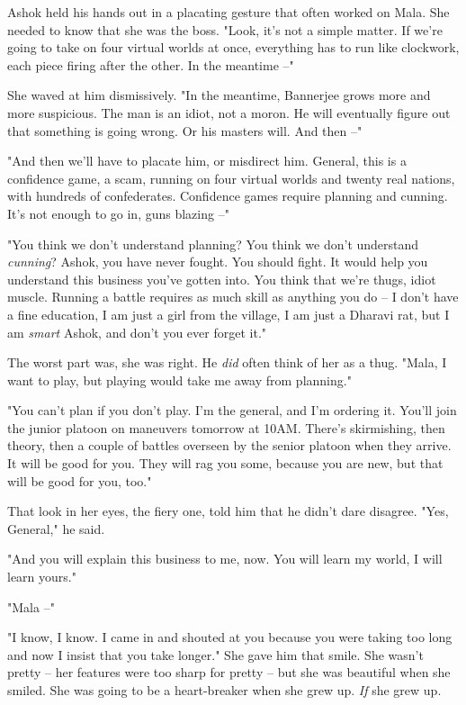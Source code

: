 Ashok held his hands out in a placating gesture that often worked
on Mala. She needed to know that she was the boss. "Look, it's not
a simple matter. If we're going to take on four virtual worlds at
once, everything has to run like clockwork, each piece firing after
the other. In the meantime --"

She waved at him dismissively. "In the meantime, Bannerjee grows
more and more suspicious. The man is an idiot, not a moron. He will
eventually figure out that something is going wrong. Or his masters
will. And then --"

"And then we'll have to placate him, or misdirect him. General,
this is a confidence game, a scam, running on four virtual worlds
and twenty real nations, with hundreds of confederates. Confidence
games require planning and cunning. It's not enough to go in, guns
blazing --"

"You think we don't understand planning? You think we don't
understand \emph{cunning}? Ashok, you have never fought. You should
fight. It would help you understand this business you've gotten
into. You think that we're thugs, idiot muscle. Running a battle
requires as much skill as anything you do -- I don't have a fine
education, I am just a girl from the village, I am just a Dharavi
rat, but I am \emph{smart} Ashok, and don't you ever forget it."

The worst part was, she was right. He \emph{did} often think of her
as a thug. "Mala, I want to play, but playing would take me away
from planning."

"You can't plan if you don't play. I'm the general, and I'm
ordering it. You'll join the junior platoon on maneuvers tomorrow
at 10AM. There's skirmishing, then theory, then a couple of battles
overseen by the senior platoon when they arrive. It will be good
for you. They will rag you some, because you are new, but that will
be good for you, too."

That look in her eyes, the fiery one, told him that he didn't dare
disagree. "Yes, General," he said.

"And you will explain this business to me, now. You will learn my
world, I will learn yours."

"Mala --"

"I know, I know. I came in and shouted at you because you were
taking too long and now I insist that you take longer." She gave
him that smile. She wasn't pretty -- her features were too sharp
for pretty -- but she was beautiful when she smiled. She was going
to be a heart-breaker when she grew up. \emph{If} she grew up.

